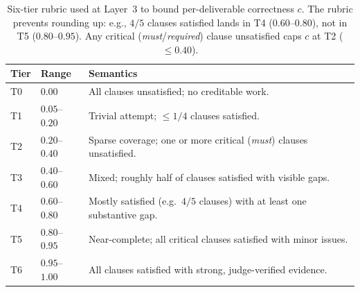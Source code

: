 \begin{table}[!htbp]
\centering
\footnotesize
\setlength{\tabcolsep}{4pt}
\renewcommand{\arraystretch}{1.2}
\begin{tabular}{@{}l l p{4.2cm}@{}}
\toprule
\textbf{Tier} & \textbf{Range} & \textbf{Semantics} \\
\midrule
T0 & $0.00$            & All clauses unsatisfied; no creditable work. \\
T1 & $0.05$--$0.20$    & Trivial attempt; $\leq 1/4$ clauses satisfied. \\
T2 & $0.20$--$0.40$    & Sparse coverage; one or more critical (\emph{must}) clauses unsatisfied. \\
T3 & $0.40$--$0.60$    & Mixed; roughly half of clauses satisfied with visible gaps. \\
T4 & $0.60$--$0.80$    & Mostly satisfied (e.g.\ $4/5$ clauses) with at least one substantive gap. \\
T5 & $0.80$--$0.95$    & Near-complete; all critical clauses satisfied with minor issues. \\
T6 & $0.95$--$1.00$    & All clauses satisfied with strong, judge-verified evidence. \\
\bottomrule
\end{tabular}
\caption{Six-tier rubric used at Layer~3 to bound per-deliverable correctness $c$. The rubric prevents rounding up: e.g., $4/5$ clauses satisfied lands in T4 ($0.60$--$0.80$), not in T5 ($0.80$--$0.95$). Any critical (\emph{must}/\emph{required}) clause unsatisfied caps $c$ at T2 ($\leq 0.40$).}
\label{tab:rubric}
\end{table}

